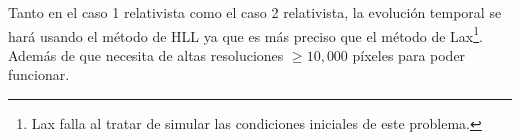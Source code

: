 \documentclass[12pt,a4paper]{book}
\begin{document}
Tanto en el caso 1 relativista como el caso 2 relativista, la evolución temporal se hará usando 
el método de HLL ya que es más preciso que el método de Lax\footnote{
  Lax falla al tratar de simular las condiciones iniciales de este problema.
}. 
Además de que necesita de altas resoluciones $\geq 10,000$ píxeles para poder funcionar.

\begin{figure}
  \centering

\end{figure}
\end{document}
